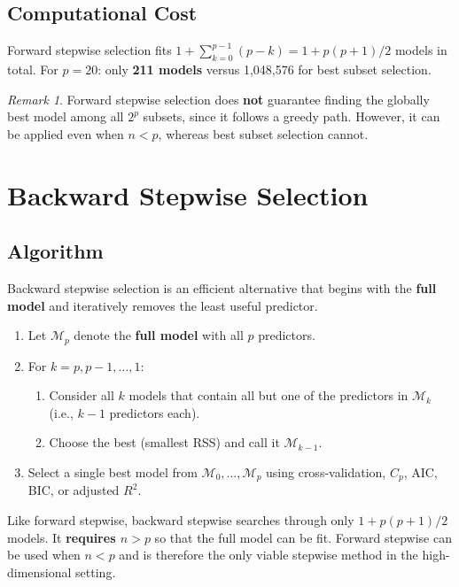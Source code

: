 \documentclass[11pt,a4paper]{article}
\theoremstyle{definition}
\theoremstyle{plain}
\theoremstyle{remark}
\newtheorem*{remark}{Remark}
\begin{document}
\subsection{Computational Cost}

Forward stepwise selection fits $1 + \sum_{k=0}^{p-1}(p - k) = 1 + p(p+1)/2$ models in total. For $p = 20$: only \textbf{211 models} versus 1,048,576 for best subset selection.

\begin{remark}
Forward stepwise selection does \textbf{not} guarantee finding the globally best model among all $2^p$ subsets, since it follows a greedy path. However, it can be applied even when $n < p$, whereas best subset selection cannot.
\end{remark}


\section{Backward Stepwise Selection}

\subsection{Algorithm}

Backward stepwise selection is an efficient alternative that begins with the \textbf{full model} and iteratively removes the least useful predictor.

\begin{enumerate}
    \item Let $\mathcal{M}_p$ denote the \textbf{full model} with all $p$ predictors.
    \item For $k = p, p-1, \ldots, 1$:
        \begin{enumerate}[label=(\alph*)]
            \item Consider all $k$ models that contain all but one of the predictors in $\mathcal{M}_k$ (i.e., $k-1$ predictors each).
            \item Choose the best (smallest RSS) and call it $\mathcal{M}_{k-1}$.
        \end{enumerate}
    \item Select a single best model from $\mathcal{M}_0, \ldots, \mathcal{M}_p$ using cross-validation, $C_p$, AIC, BIC, or adjusted $R^2$.
\end{enumerate}

Like forward stepwise, backward stepwise searches through only $1 + p(p+1)/2$ models. It \textbf{requires $n > p$} so that the full model can be fit. Forward stepwise can be used when $n < p$ and is therefore the only viable stepwise method in the high-dimensional setting.
\end{document}
